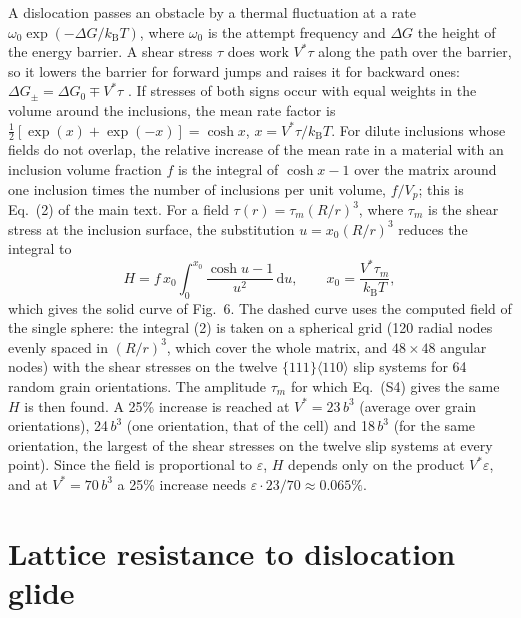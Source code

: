 \documentclass[11pt,a4paper]{article}
\begin{document}
A dislocation passes an obstacle by a thermal fluctuation at a rate
$\omega_0\exp(-\Delta G/k_{\mathrm B}T)$, where $\omega_0$ is the attempt frequency
and $\Delta G$ the height of the energy barrier. A shear stress $\tau$ does work $V^*\tau$
along the path over the barrier, so it lowers the barrier for forward jumps and
raises it for backward ones: $\Delta G_\pm=\Delta G_0\mp V^*\tau$
\cite{KocksArgonAshby1975,CaillardMartin2003}. If stresses of both signs occur
with equal weights in the volume around the inclusions, the mean rate factor is
$\tfrac12[\exp(x)+\exp(-x)]=\cosh x$, $x=V^*\tau/k_{\mathrm B}T$. For
dilute inclusions whose fields do not overlap, the relative increase
of the mean rate in a material with an inclusion volume fraction $f$ is the
integral of $\cosh x-1$ over the matrix around one inclusion times the number
of inclusions per unit volume, $f/V_p$; this is Eq.~(2) of the main text. For a
field $\tau(r)=\tau_m(R/r)^3$, where $\tau_m$ is the shear stress at the
inclusion surface, the substitution $u=x_0(R/r)^3$ reduces the
integral to
\begin{equation}
H=f\,x_0\int_0^{x_0}\frac{\cosh u-1}{u^2}\,\mathrm du,\qquad
x_0=\frac{V^*\tau_m}{k_{\mathrm B}T},
\end{equation}
which gives the solid curve of Fig.~6. The dashed curve uses the computed field
of the single sphere: the integral (2) is taken on a spherical grid (120 radial
nodes evenly spaced in $(R/r)^3$, which cover the whole matrix, and
$48\times48$ angular nodes) with the shear stresses on the
twelve $\{111\}\langle110\rangle$ slip systems for 64 random grain orientations.
The amplitude $\tau_m$ for which Eq.~(S4) gives the same $H$ is then found.
A 25\% increase is reached at $V^*=23\,b^3$ (average over grain
orientations), 24$\,b^3$ (one orientation, that of the cell) and
18$\,b^3$ (for the same orientation, the largest of the shear stresses
on the twelve slip systems at every point). Since the field is proportional to
$\varepsilon$, $H$ depends only on the product $V^*\varepsilon$, and at
$V^*=70\,b^3$ a 25\% increase needs $\varepsilon\cdot23/70\approx
0.065\%$.

\section{Lattice resistance to dislocation glide}
\end{document}
